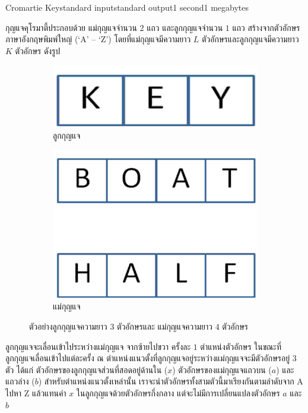 \documentclass[11pt,a4paper]{article}
\begin{document}
\begin{problem}{Cromartie Key}{standard input}{standard output}{1 second}{1 megabytes}

กุญแจคุโรมาตี้ประกอบด้วย แม่กุญแจจำนวน $2$ แถว และลูกกุญแจจำนวน $1$ แถว สร้างจากตัวอักษรภาษาอังกฤษพิมพ์ใหญ่ (‘A’ – ‘Z’) โดยที่แม่กุญแจมีความยาว $L$ ตัวอักษรและลูกกุญแจมีความยาว $K$ ตัวอักษร ดังรูป

\begin{figure}[h]
\centering
\begin{subfigure}{35ex}
\centering
\includegraphics[width=25ex]{../latex/img/1062/1062-1.png}
\caption*{ลูกกุญแจ}
\end{subfigure}%
\begin{subfigure}{35ex}
\centering
\includegraphics[width=25ex]{../latex/img/1062/1062-2.png}
\caption*{แม่กุญแจ}
\end{subfigure}%
\caption{ตัวอย่างลูกกุญแจความยาว $3$ ตัวอักษรและ แม่กุญแจความยาว $4$ ตัวอักษร}
\end{figure}

ลูกกุญแจจะเลื่อนเข้าไประหว่างแม่กุญแจ จากซ้ายไปขวา ครั้งละ $1$ ตำแหน่งตัวอักษร ในขณะที่ลูกกุญแจเลื่อนเข้าไปแต่ละครั้ง ณ ตำแหน่งแนวตั้งที่ลูกกุญแจอยู่ระหว่างแม่กุญแจจะมีตัวอักษรอยู่ $3$ ตัว ได้แก่ ตัวอักษรของลูกกุญแจส่วนที่สอดอยู่ด้านใน ($x$) ตัวอักษรของแม่กุญแจแถวบน ($a$) และแถวล่าง ($b$) สำหรับตำแหน่งแนวตั้งเหล่านั้น เราจะนำตัวอักษรทั้งสามตัวนี้มาเรียงกันตามลำดับจาก A ไปหา Z แล้วแทนค่า $x$ ในลูกกุญแจด้วยตัวอักษรกึ่งกลาง แต่จะไม่มีการเปลี่ยนแปลงตัวอักษร $a$ และ $b$


\end{problem}
\end{document}
